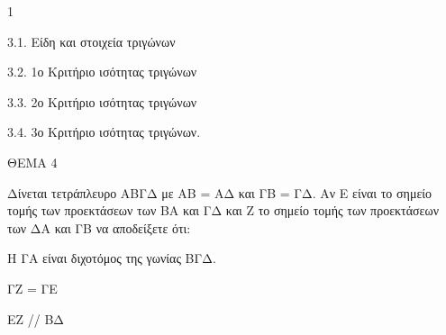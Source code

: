 \begin{ylh}{1}
    \item 3.1. Είδη και στοιχεία τριγώνων
    \item 3.2. 1ο Κριτήριο ισότητας τριγώνων
    \item 3.3. 2ο Κριτήριο ισότητας τριγώνων
    \item 3.4. 3ο Κριτήριο ισότητας τριγώνων.
\end{ylh}

ΘΕΜΑ 4

Δίνεται τετράπλευρο ΑΒΓΔ με ΑΒ = ΑΔ και ΓΒ = ΓΔ. Αν Ε είναι το σημείο τομής των προεκτάσεων των ΒΑ και ΓΔ και Ζ το σημείο τομής των προεκτάσεων των ΔΑ και ΓΒ να αποδείξετε ότι:

\begin{alist}
\item Η ΓΑ είναι διχοτόμος της γωνίας ΒΓΔ. 

\item ΓΖ = ΓΕ 

\item ΕΖ // ΒΔ 


\begin{center}
\end{center}
\end{alist}
